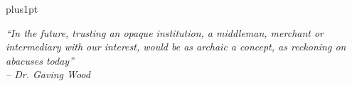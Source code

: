 \documentclass[twoside,11pt]{Latex/Classes/PhDthesisPSnPDF}
\theoremstyle{definition}
\theoremstyle{remark}
\begin{document}
\newpage



\hfuzz=50pt




\renewcommand\baselinestretch{1}
\baselineskip=18pt plus1pt



\begin{center}
\textit{``In the future, trusting an opaque institution, a middleman, merchant or intermediary with our interest, would be as archaic a concept, as reckoning on abacuses today'' \\ {\em } -- Dr. Gaving Wood}
\end{center}














\end{document}
